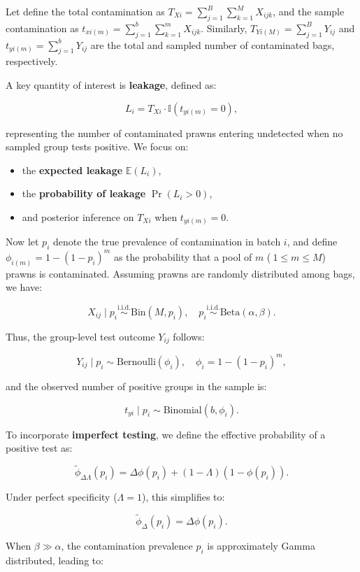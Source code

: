 \documentclass[
]{article}
\providecommand{\tightlist}{%
  \setlength{\itemsep}{0pt}\setlength{\parskip}{0pt}}
\begin{document}
Let define the total contamination as
\(T_{Xi} = \sum_{j=1}^B \sum_{k=1}^M X_{ijk}\), and the sample
contamination as \(t_{xi(m)} = \sum_{j=1}^b \sum_{k=1}^m X_{ijk}\).
Similarly, \(T_{Yi(M)} = \sum_{j=1}^B Y_{ij}\) and
\(t_{yi(m)} = \sum_{j=1}^b Y_{ij}\) are the total and sampled number of
contaminated bags, respectively.

A key quantity of interest is \textbf{leakage}, defined as:

\[
L_i = T_{Xi} \cdot \mathbb{I}(t_{yi(m)} = 0),
\]

representing the number of contaminated prawns entering undetected when
no sampled group tests positive. We focus on:

\begin{itemize}
\tightlist
\item
  the \textbf{expected leakage} \(\mathbb{E}(L_i)\),
\item
  the \textbf{probability of leakage} \(\Pr(L_i > 0)\),
\item
  and posterior inference on \(T_{Xi}\) when \(t_{yi(m)} = 0\).
\end{itemize}

Now let \(p_i\) denote the true prevalence of contamination in batch
\(i\), and define \(\phi_{i(m)} = 1 - (1 - p_i)^m\) as the probability
that a pool of \(m\) (\(\ 1 \le m \le M\)) prawns is contaminated.
Assuming prawns are randomly distributed among bags, we have:

\[
X_{ij} \mid p_i \overset{\text{i.i.d.}}{\sim} \text{Bin}(M, p_i), \quad p_i \overset{\text{i.i.d.}}{\sim} \text{Beta}(\alpha, \beta).
\]

Thus, the group-level test outcome \(Y_{ij}\) follows:

\[
Y_{ij} \mid p_i \sim \text{Bernoulli}(\phi_i), \quad \phi_i = 1 - (1 - p_i)^m,
\]

and the observed number of positive groups in the sample is:

\[
t_{yi} \mid p_i \sim \text{Binomial}(b, \phi_i).
\]

To incorporate \textbf{imperfect testing}, we define the effective
probability of a positive test as:

\[
\tilde{\phi}_{\Delta\Lambda}(p_i) = \Delta \phi(p_i) + (1 - \Lambda)(1 - \phi(p_i)).
\]

Under perfect specificity (\(\Lambda = 1\)), this simplifies to:

\[
\tilde{\phi}_\Delta(p_i) = \Delta \phi(p_i).
\]

When \(\beta \gg \alpha\), the contamination prevalence \(p_i\) is
approximately Gamma distributed, leading to:
\end{document}
